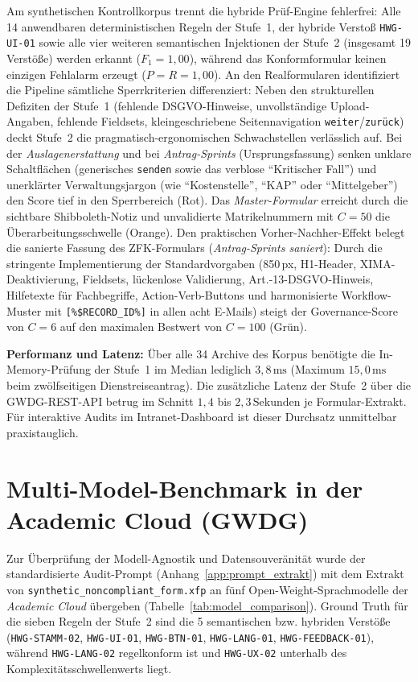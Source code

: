 Am synthetischen Kontrollkorpus trennt die hybride Prüf-Engine fehlerfrei: Alle 14 anwendbaren deterministischen Regeln der Stufe~1, der hybride Verstoß \texttt{HWG-UI-01} sowie alle vier weiteren semantischen Injektionen der Stufe~2 (insgesamt 19 Verstöße) werden erkannt ($F_1 = 1{,}00$), während das Konformformular keinen einzigen Fehlalarm erzeugt ($P = R = 1{,}00$). An den Realformularen identifiziert die Pipeline sämtliche Sperrkriterien differenziert: Neben den strukturellen Defiziten der Stufe~1 (fehlende DSGVO-Hinweise, unvollständige Upload-Angaben, fehlende Fieldsets, kleingeschriebene Seitennavigation \texttt{weiter}/\texttt{zurück}) deckt Stufe~2 die pragmatisch-ergonomischen Schwachstellen verlässlich auf. Bei der \textit{Auslagenerstattung} und bei \textit{Antrag-Sprints} (Ursprungsfassung) senken unklare Schaltflächen (generisches \texttt{senden} sowie das verblose \enquote{Kritischer Fall}) und unerklärter Verwaltungsjargon (wie \enquote{Kostenstelle}, \enquote{KAP} oder \enquote{Mittelgeber}) den Score tief in den Sperrbereich (Rot). Das \textit{Master-Formular} erreicht durch die sichtbare Shibboleth-Notiz und unvalidierte Matrikelnummern mit $C = 50$ die Überarbeitungsschwelle (Orange). Den praktischen Vorher-Nachher-Effekt belegt die sanierte Fassung des ZFK-Formulars (\textit{Antrag-Sprints saniert}): Durch die stringente Implementierung der Standardvorgaben (850\,px, H1-Header, XIMA-Deaktivierung, Fieldsets, lückenlose Validierung, Art.-13-DSGVO-Hinweis, Hilfetexte für Fachbegriffe, Action-Verb-Buttons und harmonisierte Workflow-Muster mit \texttt{[\%\$RECORD\_ID\%]} in allen acht E-Mails) steigt der Governance-Score von $C = 6$ auf den maximalen Bestwert von $C = 100$ (Grün).

\textbf{Performanz und Latenz:} Über alle 34 Archive des Korpus benötigte die In-Memory-Prüfung der Stufe~1 im Median lediglich $3{,}8\,\text{ms}$ (Maximum $15{,}0\,\text{ms}$ beim zwölfseitigen Dienstreiseantrag). Die zusätzliche Latenz der Stufe~2 über die GWDG-REST-API betrug im Schnitt $1{,}4$ bis $2{,}3\,\text{Sekunden}$ je Formular-Extrakt. Für interaktive Audits im Intranet-Dashboard ist dieser Durchsatz unmittelbar praxistauglich.

\section{Multi-Model-Benchmark in der Academic Cloud (GWDG)}
\label{sec:opensource_eval}

Zur Überprüfung der Modell-Agnostik und Datensouveränität wurde der standardisierte Audit-Prompt (Anhang~\ref{app:prompt_extrakt}) mit dem Extrakt von \texttt{synthetic\_noncompliant\_form.xfp} an fünf Open-Weight-Sprachmodelle der \textit{Academic Cloud} übergeben (Tabelle~\ref{tab:model_comparison}). Ground Truth für die sieben Regeln der Stufe~2 sind die 5 semantischen bzw. hybriden Verstöße (\texttt{HWG-STAMM-02}, \texttt{HWG-UI-01}, \texttt{HWG-BTN-01}, \texttt{HWG-LANG-01}, \texttt{HWG-FEEDBACK-01}), während \texttt{HWG-LANG-02} regelkonform ist und \texttt{HWG-UX-02} unterhalb des Komplexitätsschwellenwerts liegt.

